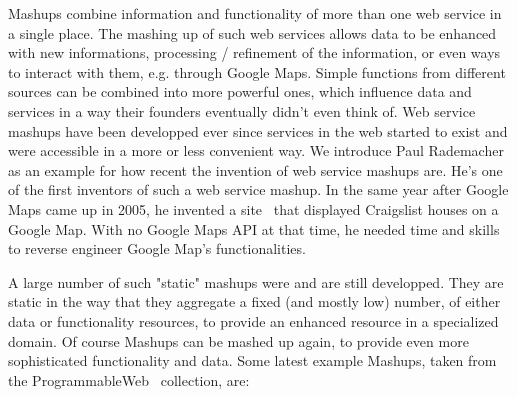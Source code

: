 








Mashups combine information and functionality of more than one web service in a single place.
The mashing up of such web services allows data to be enhanced with new informations, processing / refinement of the information, or even ways to interact with them, e.g. through Google Maps.
Simple functions from different sources can be combined into more powerful ones, which influence data and services in a way their founders eventually didn't even think of.
Web service mashups have been developped ever since services in the web started to exist and were accessible in a more or less convenient way.
We introduce Paul Rademacher as an example for how recent the invention of web service mashups are.
He's one of the first inventors of such a web service mashup.
In the same year after Google Maps came up in 2005, he invented a site~\cite{wwwRademacherOne,wwwRademacherTwo} that displayed Craigslist houses on a Google Map.
With no Google Maps API at that time, he needed time and skills to reverse engineer Google Map's functionalities.


A large number of such "static" mashups were and are still developped.
They are static in the way that they aggregate a fixed (and mostly low) number, of either data or functionality resources, to provide an enhanced resource in a specialized domain.
Of course Mashups can be mashed up again, to provide even more sophisticated functionality and data.
Some latest example Mashups, taken from the ProgrammableWeb~\cite{wwwProgrammableWeb} collection, are:

